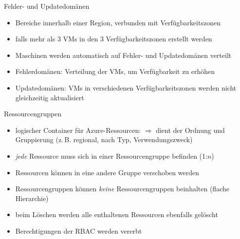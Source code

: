 \begin{flashcard}[Definition]{Fehler- und Updatedomänen}
    \begin{itemize}
        \item Bereiche innerhalb einer Region, verbunden mit Verfügbarkeitszonen
        \item falls mehr als 3 VMs in den 3 Verfügbarkeitszonen erstellt werden
        \item Maschinen werden automatisch auf Fehler- und Updatedomänen verteilt
        \item Fehlerdomänen:\newline
            Verteilung der VMs, um Verfügbarkeit zu erhöhen
        \item Updatedomänen:\newline
            VMs in verschiedenen Verfügbarkeitszonen werden nicht gleichzeitig aktualisiert
    \end{itemize}
\end{flashcard}

\begin{flashcard}[Definition]{Ressourcengruppen}
    \begin{itemize}
        \item logischer Container für Azure-Ressourcen:\newline
        $\Rightarrow$ dient der Ordnung und Gruppierung (z.\,B. regional, nach Typ, Verwendungszweck)
        \item \emph{jede} Ressource muss sich in einer Ressourcengruppe befinden (1:$n$)
        \item Ressourcen können in eine andere Gruppe verschoben werden
        \item Ressourcengruppen können \emph{keine} Ressourcengruppen beinhalten (flache Hierarchie)
        \item beim Löschen werden alle enthaltenen Ressourcen ebenfalls gelöscht
        \item Berechtigungen der RBAC werden vererbt
    \end{itemize}

\end{flashcard}

